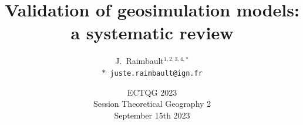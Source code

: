 \documentclass[english,11pt]{beamer}
\begin{document}
\title{Validation of geosimulation models: a systematic review}

\author{J.~Raimbault$^{1,2,3,4,\ast}$\\
\texttt{$\ast$ juste.raimbault@ign.fr}
}




\date{ECTQG 2023\\\smallskip
Session Theoretical Geography 2\\\smallskip
September 15th 2023
}

\frame{\maketitle}




\end{document}
